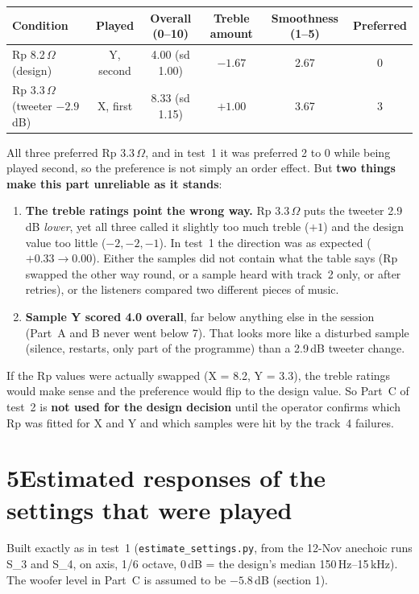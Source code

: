 \documentclass[11pt,a4paper]{article}
\begin{document}
\begin{center}\small
\begin{tabular}{@{}lccccc@{}}\toprule
Condition & Played & Overall (0--10) & Treble amount & Smoothness (1--5) & Preferred\\\midrule
Rp 8.2\,$\Omega$ (design) & Y, second & 4.00 (sd 1.00) & $-1.67$ & 2.67 & 0\\
Rp 3.3\,$\Omega$ (tweeter $-2.9$\,dB) & X, first & 8.33 (sd 1.15) & $+1.00$ & 3.67 & 3\\\bottomrule
\end{tabular}
\end{center}

All three preferred Rp 3.3\,$\Omega$, and in test~1 it was preferred 2 to 0 while being played second, so the
preference is not simply an order effect. But \textbf{two things make this part unreliable as it stands}:
\begin{enumerate}\setlength{\itemsep}{1pt}
\item \textbf{The treble ratings point the wrong way.} Rp 3.3\,$\Omega$ puts the tweeter 2.9\,dB
\emph{lower}, yet all three called it slightly too much treble ($+1$) and the design value too little
($-2, -2, -1$). In test~1 the direction was as expected ($+0.33 \rightarrow 0.00$). Either the samples did not
contain what the table says (Rp swapped the other way round, or a sample heard with track~2 only, or after
retries), or the listeners compared two different pieces of music.
\item \textbf{Sample Y scored 4.0 overall}, far below anything else in the session (Part~A and B never went
below 7). That looks more like a disturbed sample (silence, restarts, only part of the programme) than a
2.9\,dB tweeter change.
\end{enumerate}
If the Rp values were actually swapped (X = 8.2, Y = 3.3), the treble ratings would make sense and the
preference would flip to the design value. So Part~C of test~2 is \textbf{not used for the design decision}
until the operator confirms which Rp was fitted for X and Y and which samples were hit by the track~4
failures.

\section*{5\quad Estimated responses of the settings that were played}
Built exactly as in test~1 (\texttt{estimate\_settings.py}, from the 12-Nov anechoic runs S\_3 and S\_4,
on axis, 1/6 octave, 0\,dB = the design's median 150\,Hz--15\,kHz). The woofer level in Part~C is assumed
to be $-5.8$\,dB (section 1).
\end{document}
